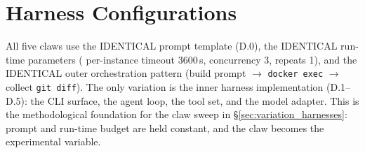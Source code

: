 \documentclass{llmxive}
\begin{document}




\section{Harness Configurations}\label{appendix:harness}

All five claws use the IDENTICAL prompt template (D.0), the IDENTICAL run-time parameters ( per-instance timeout 3600\,s, concurrency 3, repeats 1), and the IDENTICAL outer orchestration pattern (build prompt $\rightarrow$ \texttt{docker exec} $\rightarrow$ collect \texttt{git diff}). The only variation is the inner harness implementation (D.1--D.5): the CLI surface, the agent loop, the tool set, and the model adapter. This is the methodological foundation for the claw sweep in \S\ref{sec:variation_harnesses}: prompt and run-time budget are held constant, and the claw becomes the experimental variable.
\end{document}
